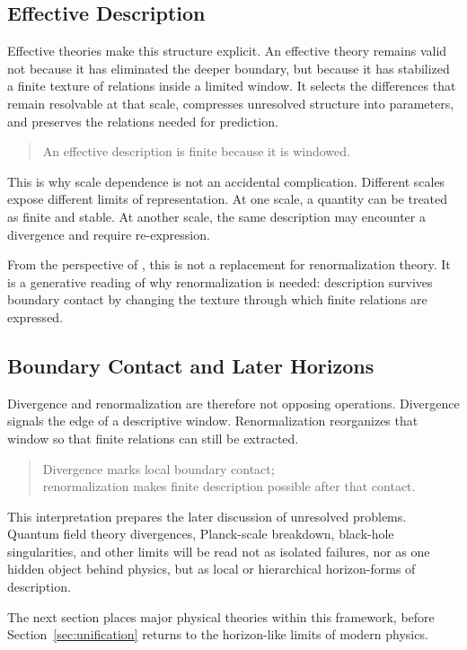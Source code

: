 \subsection*{Effective Description}

Effective theories make this structure explicit.
An effective theory remains valid not because it has eliminated the
deeper boundary,
but because it has stabilized a finite texture of relations inside a
limited window.
It selects the differences that remain resolvable at that scale,
compresses unresolved structure into parameters,
and preserves the relations needed for prediction.

\medskip
\begin{quote}
An effective description is finite because it is windowed.
\end{quote}
\medskip

This is why scale dependence is not an accidental complication.
Different scales expose different limits of representation.
At one scale,
a quantity can be treated as finite and stable.
At another scale,
the same description may encounter a divergence and require
re-expression.

From the perspective of \VED{},
this is not a replacement for renormalization theory.
It is a generative reading of why renormalization is needed:
description survives boundary contact by changing the texture through
which finite relations are expressed.

\subsection*{Boundary Contact and Later Horizons}

Divergence and renormalization are therefore not opposing operations.
Divergence signals the edge of a descriptive window.
Renormalization reorganizes that window so that finite relations can
still be extracted.

\medskip
\begin{quote}
Divergence marks local boundary contact;\\
renormalization makes finite description possible after that contact.
\end{quote}
\medskip

This interpretation prepares the later discussion of unresolved
problems.
Quantum field theory divergences,
Planck-scale breakdown,
black-hole singularities,
and other limits will be read not as isolated failures,
nor as one hidden object behind physics,
but as local or hierarchical horizon-forms of description.

The next section places major physical theories within this framework,
before Section~\ref{sec:unification} returns to the horizon-like
limits of modern physics.

